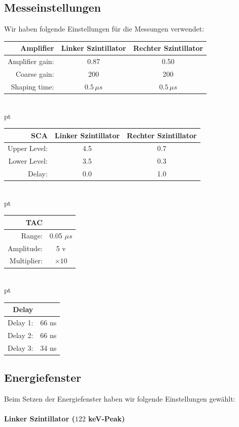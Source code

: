 \documentclass[12pt]{article}
\begin{document}
\subsection{Messeinstellungen}
Wir haben folgende Einstellungen für die Messungen verwendet:
\begin{table}[h!]
	\centering
	\begin{tabular}{r|cc}
		\textbf{Amplifier}&Linker Szintillator&Rechter Szintillator \\\hline
		Amplifier gain:  & 0.87 & 0.50\\
		Coarse gain:  & 200 & 200\\
		Shaping time:  & $0.5\,\mu s$ & $0.5\,\mu s$\\
	\end{tabular}\\ pt
	\begin{tabular}{r|cc}
		\textbf{SCA}&Linker Szintillator&Rechter Szintillator \\\hline
		Upper Level:  & 4.5 & 0.7\\
		Lower Level:  & 3.5 & 0.3\\
		Delay:  & 0.0 & 1.0\\
	\end{tabular}\\ pt
	\begin{tabular}{r|c}
		\textbf{TAC}&\\\hline
		Range:  & 0.05 $\mu s$ \\
		Amplitude:  & 5 v \\
		Multiplier:  & $\times 10$ \\
	\end{tabular}\\ pt
	\begin{tabular}{r|c}
		\textbf{Delay}&\\\hline
		Delay 1:  & 66 ns \\
		Delay 2:  & 66 ns \\
		Delay 3:  & 34 ns \\
	\end{tabular}
\end{table}

\subsection{Energiefenster}

Beim Setzen der Energiefenster haben wir folgende Einstellungen gewählt:

\paragraph{Linker Szintillator ($122$ keV-Peak)}
\ \\
\end{document}
